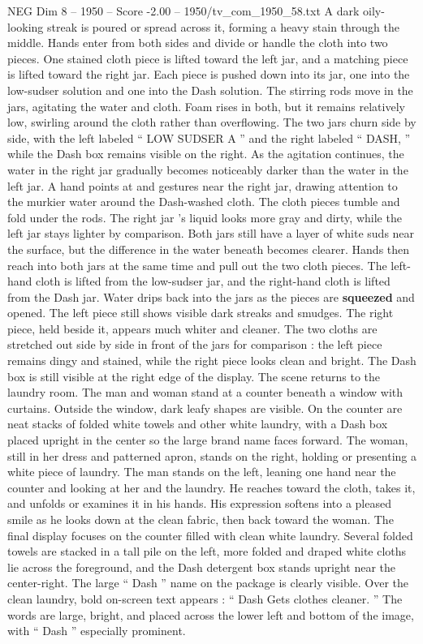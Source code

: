 \begin{textsample}{NEG Dim 8 – 1950 – Score -2.00 – 1950/tv\_com\_1950\_58.txt}
A dark oily-looking streak is poured or spread across it, forming a heavy stain through the middle.
Hands enter from both sides and divide or handle the cloth into two pieces.
One stained cloth piece is lifted toward the left jar, and a matching piece is lifted toward the right jar.
Each piece is pushed down into its jar, one into the low-sudser solution and one into the Dash solution.
The stirring rods move in the jars, agitating the water and cloth.
Foam rises in both, but it remains relatively low, swirling around the cloth rather than overflowing.
The two jars churn side by side, with the left labeled “ LOW SUDSER A ” and the right labeled “ DASH, ” while the Dash box remains visible on the right.
As the agitation continues, the water in the right jar gradually becomes noticeably darker than the water in the left jar.
A hand points at and gestures near the right jar, drawing attention to the murkier water around the Dash-washed cloth.
The cloth pieces tumble and fold under the rods.
The right jar ’s liquid looks more gray and dirty, while the left jar stays lighter by comparison.
Both jars still have a layer of white suds near the surface, but the difference in the water beneath becomes clearer.
Hands then reach into both jars at the same time and pull out the two cloth pieces.
The left-hand cloth is lifted from the low-sudser jar, and the right-hand cloth is lifted from the Dash jar.
Water drips back into the jars as the pieces are \textbf{squeezed} and opened.
The left piece still shows visible dark streaks and smudges.
The right piece, held beside it, appears much whiter and cleaner.
The two cloths are stretched out side by side in front of the jars for comparison : the left piece remains dingy and stained, while the right piece looks clean and bright.
The Dash box is still visible at the right edge of the display.
The scene returns to the laundry room.
The man and woman stand at a counter beneath a window with curtains.
Outside the window, dark leafy shapes are visible.
On the counter are neat stacks of folded white towels and other white laundry, with a Dash box placed upright in the center so the large brand name faces forward.
The woman, still in her dress and patterned apron, stands on the right, holding or presenting a white piece of laundry.
The man stands on the left, leaning one hand near the counter and looking at her and the laundry.
He reaches toward the cloth, takes it, and unfolds or examines it in his hands.
His expression softens into a pleased smile as he looks down at the clean fabric, then back toward the woman.
The final display focuses on the counter filled with clean white laundry.
Several folded towels are stacked in a tall pile on the left, more folded and draped white cloths lie across the foreground, and the Dash detergent box stands upright near the center-right.
The large “ Dash ” name on the package is clearly visible.
Over the clean laundry, bold on-screen text appears : “ Dash Gets clothes cleaner. ” The words are large, bright, and placed across the lower left and bottom of the image, with “ Dash ” especially prominent.

\end{textsample}
